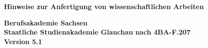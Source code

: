 \begin{titlepage}
    \begin{minipage}{0.7\columnwidth}
        
    \end{minipage}
    \begin{center}
        \Huge
        \vspace{.1\pdfpageheight}
        
        \textbf{Hinweise zur Anfertigung von wissenschaftlichen Arbeiten \vspace{.2\pdfpageheight}}
        
        \Large
        \textbf{Berufsakademie Sachsen\\Staatliche Studienakademie Glauchau}
        \normalsize
        \vfill
        \textbf{nach 4BA-F.207\\\vspace{1cm}Version 5.1}
    \end{center}
\end{titlepage}
\newpage
    